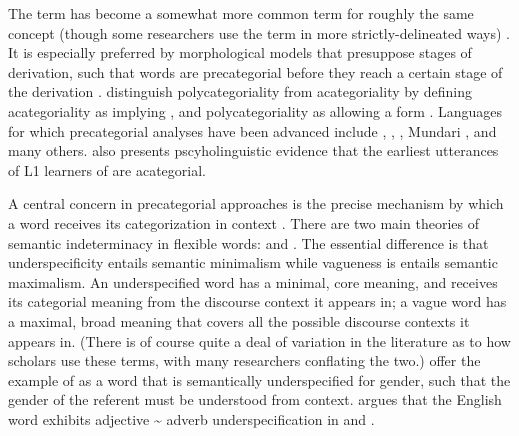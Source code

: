 The term  has become a somewhat more common term for roughly the same concept (though some researchers use the term in more strictly-delineated ways) \parencites[357, 362--364]{EvansOsada2005}{Bisang2008}{Bisang2013}. It is especially preferred by morphological models that presuppose stages of derivation, such that words are precategorial before they reach a certain stage of the derivation \parencites{HalleMarantz1994}{Arad2005}{McGinnisArchibald2016}{Siddiqi2018}. \textcite[5]{VapnarskyVeneziano2017a} distinguish polycategoriality from acategoriality by defining acategoriality as implying , and polycategoriality as allowing a form . Languages for which precategorial analyses have been advanced include  \parencite{Haag2017},  \parencite{McGregor2013},  \parencite{FranchettoSantos2017}, Mundari \parencite{HengeveldRijkhoff2005}, and many others. \textcite{Pfeiler2017} also presents pscyholinguistic evidence that the earliest utterances of L1 learners of  are acategorial.

A central concern in precategorial approaches is the precise mechanism by which a word receives its categorization in context \parencite[§3.7]{HengeveldRijkhoffSiewierska2004}. There are two main theories of semantic indeterminacy in flexible words:  \parencites{Farrell2001}{RijkhoffLier2013} and  \parencites{Tuggy1993}{HengeveldRijkhoffSiewierska2004}{HengeveldRijkhoff2005}. The essential difference is that underspecificity entails semantic minimalism while vagueness is entails semantic maximalism. An underspecified word has a minimal, core meaning, and receives its categorial meaning from the discourse context it appears in; a vague word has a maximal, broad meaning that covers all the possible discourse contexts it appears in. (There is of course quite a deal of variation in the literature as to how scholars use these terms, with many researchers conflating the two.) \textcite[414]{HengeveldRijkhoff2005} offer the example of   as a word that is semantically underspecified for gender, such that the gender of the referent must be understood from context. \textcite{Denison2018} argues that the English word  exhibits adjective {\textasciitilde} adverb underspecification in  and .

